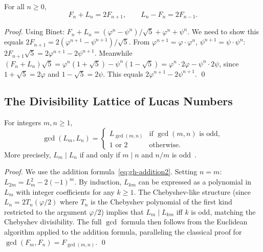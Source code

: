 \begin{proposition}
\label{prop:gh-fibsum}
For all \(n \geq 0\),
\begin{equation}\label{eq:gh-fibsum}
  F_n + L_n = 2F_{n+1},
  \qquad
  L_n - F_n = 2F_{n-1}.
\end{equation}
\end{proposition}
\begin{proof}
Using Binet: \(F_n + L_n = (\varphi^n-\psi^n)/\sqrt{5} + \varphi^n+\psi^n\).
We need to show this equals \(2F_{n+1} = 2(\varphi^{n+1}-\psi^{n+1})/\sqrt{5}\).
From \(\varphi^{n+1} = \varphi\cdot\varphi^n\), \(\psi^{n+1} = \psi\cdot\psi^n\):
\(2F_{n+1}\sqrt{5} = 2\varphi^{n+1}-2\psi^{n+1}\).
Meanwhile \((F_n+L_n)\sqrt{5} = \varphi^n(1+\sqrt{5}) - \psi^n(1-\sqrt{5})
   = \varphi^n \cdot 2\varphi - \psi^n \cdot 2\psi\),
since \(1+\sqrt{5}=2\varphi\) and \(1-\sqrt{5}=2\psi\).
This equals \(2\varphi^{n+1}-2\psi^{n+1}\). \qed
\end{proof}

\subsection{The Divisibility Lattice of Lucas Numbers}
\label{subsec:gh-divlattice}

\begin{theorem}
\label{thm:gh-divlattice}
For integers \(m, n \geq 1\),
\begin{equation}\label{eq:gh-div}
  \gcd(L_m, L_n) = \begin{cases}
    L_{\gcd(m,n)} & \text{if } \gcd(m,n) \text{ is odd}, \\
    1 \text{ or } 2 & \text{otherwise}.
  \end{cases}
\end{equation}
More precisely, \(L_m \mid L_n\) if and only if \(m \mid n\) and
\(n/m\) is odd~\cite{koshy_fib_lucas}.
\end{theorem}

\begin{proof}
We use the addition formula~\eqref{eq:gh-addition2}.
Setting \(n = m\): \(L_{2m} = L_m^2 - 2(-1)^m\).
By induction, \(L_{km}\) can be expressed as a polynomial in \(L_m\)
with integer coefficients for any \(k \geq 1\).
The Chebyshev-like structure (since \(L_n = 2T_n(\varphi/2)\) where
\(T_n\) is the Chebyshev polynomial of the first kind restricted to
the argument \(\varphi/2\)) implies that \(L_m \mid L_{km}\) iff
\(k\) is odd, matching the Chebyshev divisibility.
The full \(\gcd\) formula then follows from the Euclidean algorithm
applied to the addition formula, paralleling the classical proof for
\(\gcd(F_m, F_n) = F_{\gcd(m,n)}\).
\qed
\end{proof}

